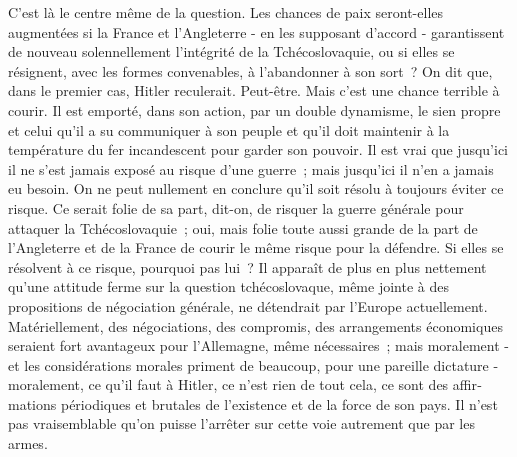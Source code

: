 \documentclass[french,twoside]{book} %
\begin{document}
\noindent C'est là le centre même de la question. Les chances de paix seront-elles augmentées si la France et l'Angleterre - en les supposant d'accord - garantissent de nouveau solennellement l'intégrité de la Tchécoslovaquie, ou si elles se résignent, avec les formes convenables, à l'abandonner à son sort ? On dit que, dans le premier cas, Hitler reculerait. Peut-être. Mais c'est une chance terrible à courir. Il est emporté, dans son action, par un double dynamisme, le sien propre et celui qu'il a su communiquer à son peuple et qu'il doit maintenir à la température du fer incandescent pour garder son pouvoir. Il est vrai que jusqu'ici il ne s'est jamais exposé au risque d'une guerre ; mais jusqu'ici il n'en a jamais eu besoin. On ne peut nullement en conclure qu'il soit résolu à toujours éviter ce risque. Ce serait folie de sa part, dit-on, de risquer la guerre générale pour attaquer la Tchécoslovaquie ; oui, mais folie toute aussi grande de la part de l'Angleterre et de la France de courir le même risque pour la défendre. Si elles se résolvent à ce risque, pourquoi pas lui ? Il apparaît de plus en plus nettement qu'une attitude ferme sur la question tchécoslovaque, même jointe à des propositions de négociation générale, ne détendrait par l'Europe actuellement. Matériellement, des négo­ciations, des compromis, des arrangements économiques seraient fort avantageux pour l'Allemagne, même nécessaires ; mais moralement - et les considérations morales priment de beaucoup, pour une pareille dictature - moralement, ce qu'il faut à Hitler, ce n'est rien de tout cela, ce sont des affir­mations périodiques et brutales de l'existence et de la force de son pays. Il n'est pas vraisemblable qu'on puisse l'arrêter sur cette voie autrement que par les armes.\par
\end{document}
